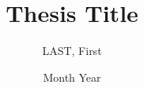 \documentclass[12pt]{report}
\title{Thesis Title}
\author{LAST, First}
\date{Month Year}
\begin{document}
\ifXeTeX
\else\fi
\clearpage
\pagestyle{main}



% 

\begin{singlespacing}
	\addbibtotoc%
	
\end{singlespacing}
\end{document}
